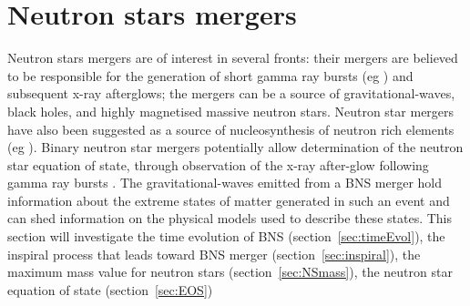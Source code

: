 \section{Neutron stars mergers}
\label{sec:NS}
Neutron stars mergers are of interest in several fronts: their mergers are believed to be responsible for the generation of short gamma ray bursts (eg \cite{Narayan1992,Rezzolla2011, Ruiz2016}) and subsequent x-ray afterglows; the mergers can be a source of gravitational-waves, black holes, and highly magnetised massive neutron stars. Neutron star mergers have also been suggested as a source of nucleosynthesis of neutron rich elements (eg \cite{Symbalisty1982,Arnould2007}).
Binary neutron star mergers potentially allow  determination of the neutron star equation of state, through observation of the x-ray after-glow following gamma ray bursts \citep{Lasky2014}. The gravitational-waves emitted from a BNS merger hold information about the extreme states of matter generated in such an event and can shed information on the physical models used to describe these states. This section will investigate the time evolution of BNS (section~\ref{sec:timeEvol}), the inspiral process that leads toward BNS merger (section~\ref{sec:inspiral}), the maximum mass value for neutron stars (section~\ref{sec:NSmass}), the neutron star equation of state (section~\ref{sec:EOS})  \par

